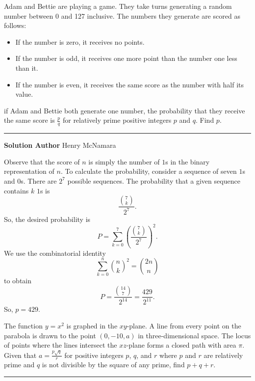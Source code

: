 \documentclass[11pt]{scrartcl}
\newcommand*{\problemfont}{\sffamily\bfseries}
\begin{document}
\pagebreak

\begin{problem}
    Adam and Bettie are playing a game. They take turns generating a random number between 0 and 127 inclusive. The numbers they generate are scored as follows:
    \begin{itemize}
        \item If the number is zero, it receives no points.
        \item If the number is odd, it receives one more point than the number one less than it.
        \item If the number is even, it receives the same score as the number with half its value.
    \end{itemize}
    if Adam and Bettie both generate one number, the probability that they receive the same score is $\frac{p}{q}$ for relatively prime positive integers $p$ and $q$. Find $p$.
\end{problem}

\vspace{-\baselineskip}\rule{\textwidth}{0.4pt}

{\problemfont Solution Author} Henry McNamara

Observe that the score of $n$ is simply the number of $1$s in the binary representation of $n$. To calculate the probability, consider a sequence of seven $1$s and $0$s. There are $2^{7}$ possible sequences. The probability that a given sequence contains $k$ $1$s is
\[\frac{{7 \choose k}}{2^7}.\]
So, the desired probability is
\[P = \sum_{k = 0}^{7}\left(\frac{{7 \choose k}}{2^7}\right)^{2}.\]
We use the combinatorial identity
\[\sum_{k = 0}^{n} {n \choose k}^{2} = {2n \choose n}\]
to obtain
\[P = \frac{{14 \choose 7}}{2^{14}} = \frac{429}{2^{11}}.\]
So, $p = \boxed{429}$.

\pagebreak

\begin{problem}
    The function $y = x^{2}$ is graphed in the $xy$-plane. A line from every point on the parabola is drawn to the point $(0, -10, a)$ in three-dimensional space. The locus of points where the lines intersect the $xz$-plane forms a closed path with area $\pi$. Given that $a = \frac{p\sqrt{q}}{r}$ for positive integers $p$, $q$, and $r$ where $p$ and $r$ are relatively prime and $q$ is not divisible by the square of any prime, find $p + q + r$.
\end{problem}

\vspace{-\baselineskip}\rule{\textwidth}{0.4pt}
\end{document}
